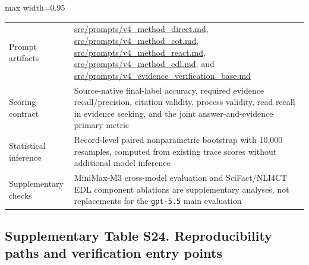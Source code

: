 \documentclass[
  8pt,
]{extarticle}
\begin{document}
\begin{center}
\begin{adjustbox}{max width=0.95\textwidth}
\begin{tabular}{@{}
ll@{}}
Prompt artifacts & \url{src/prompts/v4\_method\_direct.md},
\url{src/prompts/v4\_method\_cot.md},
\url{src/prompts/v4\_method\_react.md},
\url{src/prompts/v4\_method\_edl.md}, and
\url{src/prompts/v4\_evidence\_verification\_base.md} \\
Scoring contract & Source-native final-label accuracy, required evidence
recall/precision, citation validity, process validity, read recall in
evidence seeking, and the joint answer-and-evidence primary metric \\
Statistical inference & Record-level paired nonparametric bootstrap with
10,000 resamples, computed from existing trace scores without additional
model inference \\
Supplementary checks & MiniMax-M3 cross-model evaluation and
SciFact/NLI4CT EDL component ablations are supplementary analyses, not
replacements for the \texttt{gpt-5.5} main evaluation \\
\bottomrule
\end{tabular}
\end{adjustbox}
\end{center}

\hypertarget{supplementary-table-s24-reproducibility-paths-and-verification-entry-points}{%
\subsection{Supplementary Table S24. Reproducibility paths and
verification entry
points}\label{supplementary-table-s24-reproducibility-paths-and-verification-entry-points}}
\end{document}

